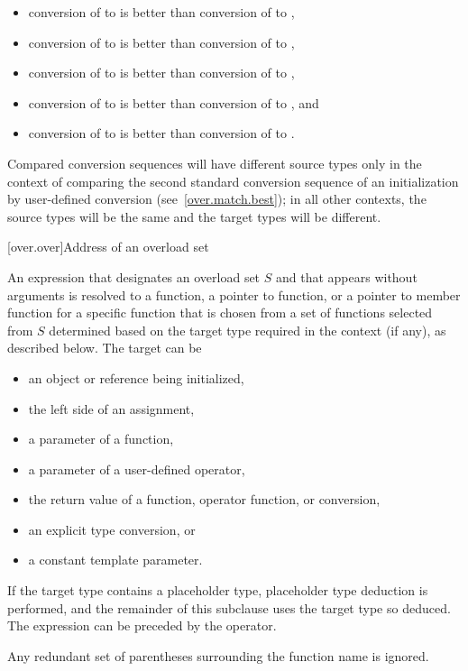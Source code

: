 \begin{itemize}
\begin{itemize}
\item
conversion of
to
is better than conversion of
to
,
\item
conversion of
to
is better than conversion of
to
,
\item
conversion of
to
is better than conversion of
to
,
\item
conversion of
to
is better than conversion
of
to
,
and
\item
conversion of
to
is better than conversion of
to
.
\end{itemize}

\begin{note}
Compared conversion sequences will have different source types only in the
context of comparing the second standard conversion sequence of an
initialization by user-defined conversion (see~\ref{over.match.best}); in
all other contexts, the source types will be the same and the target
types will be different.
\end{note}
\end{itemize}%
%

[over.over]{Address of an overload set}%
%

\pnum
An expression
that designates an overload set $S$ and
that appears without arguments
is resolved to
a function,
a pointer to function, or
a pointer to member function
for a specific function
that is chosen from a set of functions selected from $S$
determined based on the target type required in the context (if any),
as described below.
The target can be
\begin{itemize}
\item
an object or reference being initialized,
\item
the left side of an assignment,
\item
a parameter of a function,
\item
a parameter of a user-defined operator,
\item
the return value of a function, operator function, or conversion,
\item
an explicit type conversion, or
\item
a constant template parameter.
\end{itemize}
If the target type contains a placeholder type,
placeholder type deduction is performed, and
the remainder of this subclause uses the target type so deduced.
The expression can be preceded by the \tcode{\&} operator.
\begin{note}
Any redundant set of parentheses surrounding the function name is
ignored.
\end{note}

